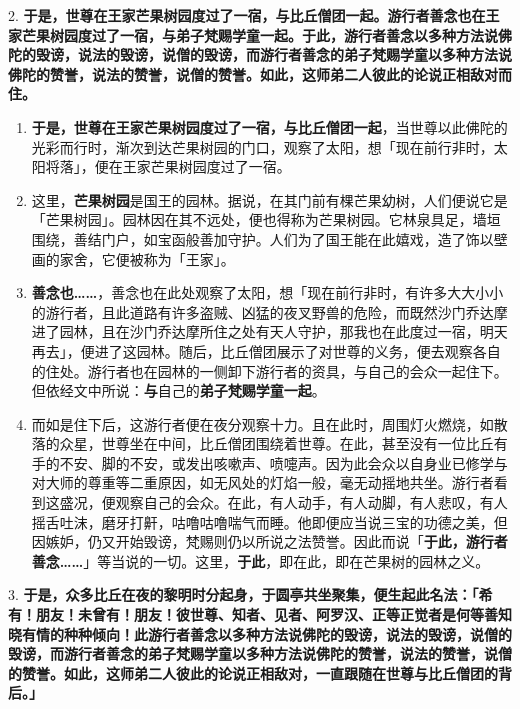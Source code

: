 {\Large 2.} \textbf{于是，世尊在王家芒果树园度过了一宿，与比丘僧团一起。游行者善念也在王家芒果树园度过了一宿，与弟子梵赐学童一起。于此，游行者善念以多种方法说佛陀的毁谤，说法的毁谤，说僧的毁谤，而游行者善念的弟子梵赐学童以多种方法说佛陀的赞誉，说法的赞誉，说僧的赞誉。如此，这师弟二人彼此的论说正相敌对而住。}

\begin{enumerate}\item \textbf{于是，世尊在王家芒果树园度过了一宿，与比丘僧团一起}，当世尊以此佛陀的光彩而行时，渐次到达芒果树园的门口，观察了太阳，想「现在前行非时，太阳将落」，便在王家芒果树园度过了一宿。
\item 这里，\textbf{芒果树园}是国王的园林。据说，在其门前有棵芒果幼树，人们便说它是「芒果树园」。园林因在其不远处，便也得称为芒果树园。它林泉具足，墙垣围绕，善结门户，如宝函般善加守护。人们为了国王能在此嬉戏，造了饰以壁画的家舍，它便被称为「王家」。
\item \textbf{善念也……}，善念也在此处观察了太阳，想「现在前行非时，有许多大大小小的游行者，且此道路有许多盗贼、凶猛的夜叉野兽的危险，而既然沙门乔达摩进了园林，且在沙门乔达摩所住之处有天人守护，那我也在此度过一宿，明天再去」，便进了这园林。随后，比丘僧团展示了对世尊的义务，便去观察各自的住处。游行者也在园林的一侧卸下游行者的资具，与自己的会众一起住下。但依经文中所说：\textbf{与}自己的\textbf{弟子梵赐学童一起}。
\item 而如是住下后，这游行者便在夜分观察十力。且在此时，周围灯火燃烧，如散落的众星，世尊坐在中间，比丘僧团围绕着世尊。在此，甚至没有一位比丘有手的不安、脚的不安，或发出咳嗽声、喷嚏声。因为此会众以自身业已修学与对大师的尊重等二重原因，如无风处的灯焰一般，毫无动摇地共坐。游行者看到这盛况，便观察自己的会众。在此，有人动手，有人动脚，有人悲叹，有人摇舌吐沫，磨牙打鼾，咕噜咕噜喘气而睡。他即便应当说三宝的功德之美，但因嫉妒，仍又开始毁谤，梵赐则仍以所说之法赞誉。因此而说「\textbf{于此，游行者善念……}」等当说的一切。这里，\textbf{于此}，即在此，即在芒果树的园林之义。\end{enumerate}

{\Large 3.} \textbf{于是，众多比丘在夜的黎明时分起身，于圆亭共坐聚集，便生起此名法：「希有！朋友！未曾有！朋友！彼世尊、知者、见者、阿罗汉、正等正觉者是何等善知晓有情的种种倾向！此游行者善念以多种方法说佛陀的毁谤，说法的毁谤，说僧的毁谤，而游行者善念的弟子梵赐学童以多种方法说佛陀的赞誉，说法的赞誉，说僧的赞誉。如此，这师弟二人彼此的论说正相敌对，一直跟随在世尊与比丘僧团的背后。」}

